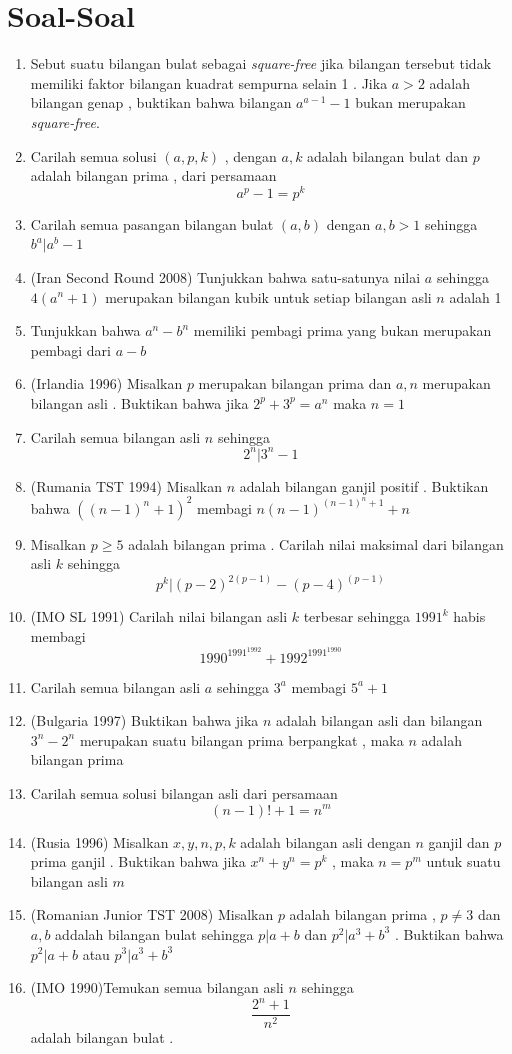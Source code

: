 \documentclass{article}
\begin{document}
\section{Soal-Soal}
\begin{enumerate}
    \item Sebut suatu bilangan bulat sebagai \textit{square-free} jika bilangan tersebut tidak memiliki faktor bilangan kuadrat sempurna selain 1 . Jika $a>2$ adalah bilangan genap , buktikan bahwa bilangan $a^{a-1}-1$ bukan merupakan \textit{square-free}.
    \item Carilah semua solusi $(a,p,k)$ ,  dengan $a,k$ adalah bilangan bulat dan $p$ adalah bilangan prima , dari persamaan $$a^p-1=p^k$$
    \item Carilah semua pasangan bilangan bulat $(a,b)$ dengan $a,b>1$ sehingga $b^a|a^b-1$
    \item (Iran Second Round 2008) Tunjukkan bahwa satu-satunya nilai $a$ sehingga $4(a^n+1)$ merupakan bilangan kubik untuk setiap bilangan asli $n$ adalah 1
    \item Tunjukkan bahwa $a^n-b^n$ memiliki pembagi prima yang bukan merupakan pembagi dari $a-b$
    \item (Irlandia 1996) Misalkan $p$ merupakan bilangan prima dan $a,n$ merupakan bilangan asli . Buktikan bahwa jika $2^p+3^p=a^n$ maka $n=1$
    \item Carilah semua bilangan asli $n$  sehingga $$2^n|3^n-1$$
    \item (Rumania TST 1994) Misalkan $n$ adalah bilangan ganjil positif . Buktikan bahwa $((n-1)^n+1)^2$ membagi $n(n-1)^{(n-1)^n+1}+n$
    \item Misalkan $p\geq 5$ adalah bilangan prima . Carilah nilai maksimal dari bilangan asli $k$ sehingga $$p^k|(p-2)^{2(p-1)}-(p-4)^{(p-1)}$$
    \item (IMO SL 1991) Carilah nilai bilangan asli $k$ terbesar sehingga $1991^k$ habis membagi $$1990^{1991^{1992}}+1992^{1991^{1990}}$$
    \item Carilah semua bilangan asli $a$ sehingga $3^a$ membagi $5^a+1$
    \item (Bulgaria 1997) Buktikan bahwa jika $n$ adalah bilangan asli dan bilangan $3^n-2^n$ merupakan suatu bilangan prima berpangkat , maka $n$ adalah bilangan prima 
    \item Carilah semua solusi bilangan asli dari persamaan $$(n-1)!+1=n^m$$
    \item (Rusia 1996) Misalkan $x,y,n,p,k$ adalah bilangan asli dengan $n$ ganjil dan $p$ prima ganjil . Buktikan bahwa jika $x^n+y^n=p^k$ , maka $n=p^m$ untuk suatu bilangan asli $m$
    \item (Romanian Junior TST 2008) Misalkan $p$ adalah bilangan prima , $p \neq 3$ dan $a,b$ addalah bilangan bulat sehingga $p|a+b$ dan $p^2|a^3+b^3$ . Buktikan bahwa $p^2|a+b$ atau $p^3|a^3+b^3$
    \item (IMO 1990)Temukan semua bilangan asli $n$ sehingga $$\dfrac{2^n+1}{n^2}$$ adalah bilangan bulat .
\end{enumerate}
\end{document}
